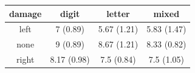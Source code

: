 \documentclass[]{article}
\begin{document}
\begin{longtable}[]{@{}cccc@{}}
\toprule
\begin{minipage}[b]{0.11\columnwidth}\centering\strut
damage\strut
\end{minipage} & \begin{minipage}[b]{0.17\columnwidth}\centering\strut
digit\strut
\end{minipage} & \begin{minipage}[b]{0.17\columnwidth}\centering\strut
letter\strut
\end{minipage} & \begin{minipage}[b]{0.17\columnwidth}\centering\strut
mixed\strut
\end{minipage}\tabularnewline
\midrule
\endhead
\begin{minipage}[t]{0.11\columnwidth}\centering\strut
left\strut
\end{minipage} & \begin{minipage}[t]{0.17\columnwidth}\centering\strut
7 (0.89)\strut
\end{minipage} & \begin{minipage}[t]{0.17\columnwidth}\centering\strut
5.67 (1.21)\strut
\end{minipage} & \begin{minipage}[t]{0.17\columnwidth}\centering\strut
5.83 (1.47)\strut
\end{minipage}\tabularnewline
\begin{minipage}[t]{0.11\columnwidth}\centering\strut
none\strut
\end{minipage} & \begin{minipage}[t]{0.17\columnwidth}\centering\strut
9 (0.89)\strut
\end{minipage} & \begin{minipage}[t]{0.17\columnwidth}\centering\strut
8.67 (1.21)\strut
\end{minipage} & \begin{minipage}[t]{0.17\columnwidth}\centering\strut
8.33 (0.82)\strut
\end{minipage}\tabularnewline
\begin{minipage}[t]{0.11\columnwidth}\centering\strut
right\strut
\end{minipage} & \begin{minipage}[t]{0.17\columnwidth}\centering\strut
8.17 (0.98)\strut
\end{minipage} & \begin{minipage}[t]{0.17\columnwidth}\centering\strut
7.5 (0.84)\strut
\end{minipage} & \begin{minipage}[t]{0.17\columnwidth}\centering\strut
7.5 (1.05)\strut
\end{minipage}\tabularnewline
\bottomrule
\end{longtable}
\end{document}
